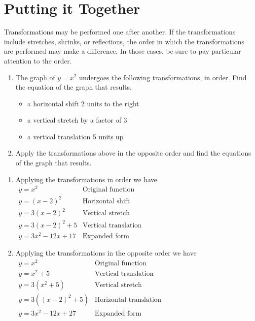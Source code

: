 \documentclass{ximera}
\begin{document}

\section{Putting it Together}
Transformations may be performed one after another. If the transformations include stretches, shrinks, or reflections, the order in which the transformations are performed may make a difference. In those cases, be sure to pay particular attention to the order.

\begin{example}
\begin{enumerate}
\item The graph of $y=x^2$ undergoes the following transformations, in order. Find the equation of the graph that results.
\begin{itemize}
\item a horizontal shift 2 units to the right
\item a vertical stretch by a factor of 3
\item a vertical translation 5 units up
\end{itemize}
\item Apply the transformations above in the opposite order and find the equations of the graph that results.
\end{enumerate}
\begin{explanation}
\begin{enumerate}
\item Applying the transformations in order we have\\
$
\begin{array}{lc}
y = x^2& \text{Original function}\\
y = (x-2)^2& \text{Horizontal shift} \\
y = 3(x-2)^2& \text{Vertical stretch} \\
y = 3(x-2)^2+5& \text{Vertical translation}\\
y = 3x^2 - 12x + 17& \text{Expanded form}
\end{array}
$
\item Applying the transformations in the opposite order we have\\
$
\begin{array}{lc}
y = x^2& \text{Original function}\\
y = x^2 + 5 & \text{Vertical translation} \\
y = 3(x^2+5)& \text{Vertical stretch} \\
y = 3((x-2)^2+5) & \text{Horizontal translation}\\
y = 3x^2 - 12x + 27& \text{Expanded form}
\end{array}
$
\end{enumerate}
\end{explanation}
\end{example}

%
\end{document}
